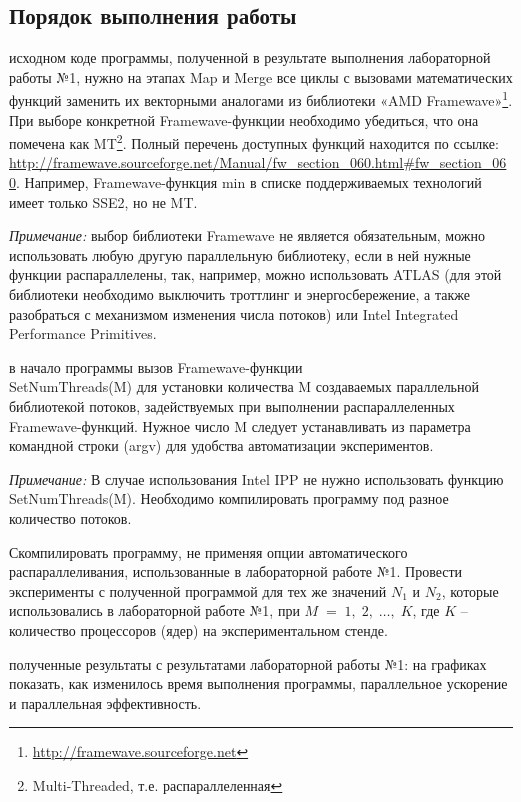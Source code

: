 \subsection{Порядок выполнения работы}
\begin{enumerate}
     исходном коде программы, полученной в результате выполнения лабораторной работы №1, нужно на этапах Map и Merge все циклы с вызовами математических функций заменить их векторными аналогами из библиотеки «AMD Framewave»\footnote{\url{http://framewave.sourceforge.net}}. При выборе конкретной Framewave-функции необходимо убедиться, что она помечена как MT\footnote{Multi-Threaded, т.е. распараллеленная}. Полный перечень доступных функций находится по ссылке: \url{http://framewave.sourceforge.net/Manual/fw_section_060.html#fw_section_060}. \quad Например, Framewave-функция min в списке поддерживаемых технологий имеет только SSE2, но не MT. 
	
    \textit{Примечание:} выбор библиотеки Framewave не является обязательным, можно использовать любую другую параллельную библиотеку, если в ней нужные функции распараллелены, так, например, можно использовать ATLAS (для этой библиотеки необходимо выключить троттлинг и энергосбережение, а также разобраться с механизмом изменения числа потоков) или Intel Integrated Performance Primitives.
	
     в начало программы вызов Framewave-функции \\SetNumThreads(M) для установки количества M создаваемых параллельной библиотекой потоков, задействуемых при выполнении распараллеленных Framewave-функций. Нужное число M следует устанавливать из параметра командной строки (argv) для удобства автоматизации экспериментов.
	
    \textit{Примечание:} В случае использования Intel IPP не нужно использовать функцию SetNumThreads(M). Необходимо компилировать программу под разное количество потоков.
	
    Скомпилировать программу, не применяя опции автоматического распараллеливания, использованные в лабораторной работе №1. Провести эксперименты с полученной программой для тех же значений $N_1$ и $N_2$, которые использовались в лабораторной работе №1, при $M\;=\;1,\;2,\;\dots,\;K$, где $K$ – количество процессоров (ядер) на экспериментальном стенде.
		
     полученные результаты с результатами лабораторной работы №1: на графиках показать, как изменилось время выполнения программы, параллельное ускорение и параллельная эффективность.
		

\end{enumerate}
